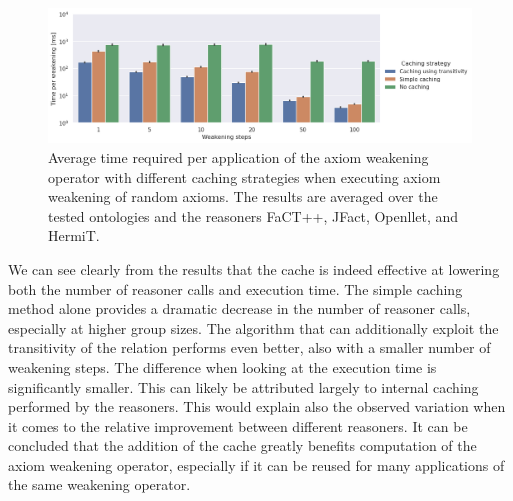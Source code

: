 \begin{figure}[ht]
  \centering
  \includegraphics[width=\textwidth]{resources/time-cache-bar.png}
  \caption{Average time required per application of the axiom weakening operator with different caching strategies when executing axiom weakening of random axioms. The results are averaged over the tested ontologies and the reasoners FaCT++, JFact, Openllet, and HermiT.}
  \label{fig:results-cache-time}
\end{figure}

We can see clearly from the results that the cache is indeed effective at lowering both the number of reasoner calls and execution time. The simple caching method alone provides a dramatic decrease in the number of reasoner calls, especially at higher group sizes. The algorithm that can additionally exploit the transitivity of the relation performs even better, also with a smaller number of weakening steps. The difference when looking at the execution time is significantly smaller. This can likely be attributed largely to internal caching performed by the reasoners. This would explain also the observed variation when it comes to the relative improvement between different reasoners. It can be concluded that the addition of the cache greatly benefits computation of the axiom weakening operator, especially if it can be reused for many applications of the same weakening operator.

